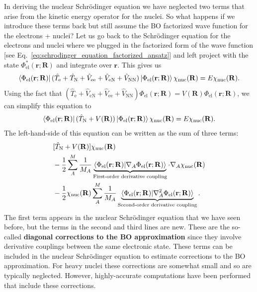 \documentclass[../Main/chem532-notes.tex]{subfiles}
\begin{document}
\begin{details}	
In deriving the nuclear Schr\"{o}dinger equation we have neglected two terms that arise from the kinetic energy operator for the nuclei. So what happens if we introduce these terms back but still assume the BO factorized wave function for the electrons + nuclei?
Let us go back to the Schr\"{o}dinger equation for the electrons and nuclei where we plugged in the factorized form of the wave function [see Eq.~\eqref{eq:schrodinger_equation_factorized_ansatz}] and left project with the state $\Phi_{\mathrm{el}}^*(\mathbf{r};\mathbf{R})$ and integrate over $\mathbf{r}$. This gives us
\begin{equation}
\begin{split}
\bra{\Phi_{\mathrm{el}}(\mathbf{r};\mathbf{R})} (\hat{T}_\mathrm{e} + \hat{T}_\mathrm{N}   + \hat{V}_\mathrm{ee} + \hat{V}_\mathrm{eN} +\hat{V}_\mathrm{NN} ) \ket{\Phi_{\mathrm{el}}(\mathbf{r};\mathbf{R})}  \chi_{\mathrm{nuc}}(\mathbf{R})
= E \chi_{\mathrm{nuc}}(\mathbf{R}).
\end{split}
\end{equation}
Using the fact that $(\hat{T}_\mathrm{e} + \hat{V}_\mathrm{eN} + \hat{V}_\mathrm{ee} + \hat{V}_\mathrm{NN} ) \Phi_{\mathrm{el}}(\mathbf{r};\mathbf{R}) = V(\mathbf{R}) \Phi_{\mathrm{el}}(\mathbf{r};\mathbf{R})$, we can simplify this equation to
\begin{equation}
\begin{split}
\bra{\Phi_{\mathrm{el}}(\mathbf{r};\mathbf{R})} (\hat{T}_\mathrm{N} +V(\mathbf{R}) ) \ket{\Phi_{\mathrm{el}}(\mathbf{r};\mathbf{R})}  \chi_{\mathrm{nuc}}(\mathbf{R})
= E \chi_{\mathrm{nuc}}(\mathbf{R}).
\end{split}
\end{equation}
The left-hand-side of this equation can be written as the sum of three terms:
\begin{equation}
\begin{split}
& [\hat{T}_\mathrm{N} +V(\mathbf{R})]  \chi_{\mathrm{nuc}}(\mathbf{R})  \\
& 
-\frac{1}{2} \sum_A^M \frac{1}{M_A}
\underbrace{\braket{\Phi_{\mathrm{el}}(\mathbf{r};\mathbf{R})|\nabla_A \Phi_{\mathrm{el}}(\mathbf{r};\mathbf{R})}}_{\text{First-order derivative coupling}}  \cdot \nabla_A \chi_{\mathrm{nuc}}(\mathbf{R}) \\
& 
-\frac{1}{2} \chi_{\mathrm{nuc}}(\mathbf{R}) \sum_A^M \frac{1}{M_A} \underbrace{\braket{\Phi_{\mathrm{el}}(\mathbf{r};\mathbf{R}) |\nabla^2_A \Phi_{\mathrm{el}}(\mathbf{r};\mathbf{R})} }_{\text{Second-order derivative coupling}}  .
\end{split}
\end{equation}
The first term appears in the nuclear Schr\"{o}dinger equation that we have seen before, but the terms in the second and third lines are new.
These are the so-called \textbf{diagonal corrections to the BO approximation} since they involve derivative couplings between the same electronic state.
These terms can be included in the nuclear Schr\"{o}dinger equation to estimate corrections to the BO approximation.
For heavy nuclei these corrections are somewhat small and so are typically neglected. 
However, highly-accurate computations have been performed that include these corrections.
\end{details}
\end{document}
